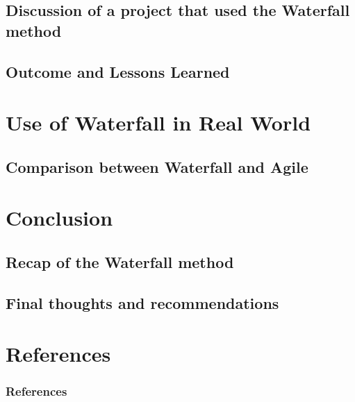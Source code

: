 \documentclass{beamer}
\begin{document}
\subsection{Discussion of a project that used the Waterfall method}
\subsection{Outcome and Lessons Learned}



\section{Use of Waterfall in Real World}
\subsection{Comparison between Waterfall and Agile}


\section{Conclusion}
\subsection{Recap of the Waterfall method}
\subsection{Final thoughts and recommendations}



\section*{References}
\begin{frame}
    \frametitle{References}
    
    
\end{frame}
\end{document}
